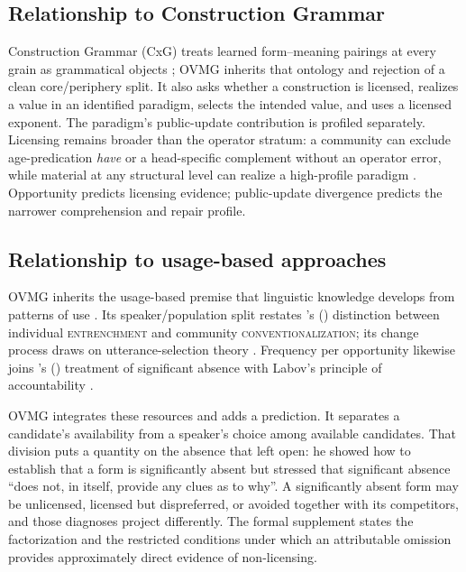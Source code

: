 \documentclass[12pt,letterpaper]{article}
\newcommand{\term}[1]{\textsc{#1}}
\newcommand{\mention}[1]{\textit{#1}}
\newcommand{\posscite}[1]{\citeauthor{#1}'s (\citeyear{#1})}
\begin{document}
\subsection{Relationship to Construction Grammar}

Construction Grammar (CxG) treats learned form--meaning pairings at every grain
as grammatical objects \autocite{fillmore1988mechanisms,fillmore1988,
kay1999grammatical,goldberg1995constructions,goldberg2019,sag2012sign}; OVMG
inherits that ontology and rejection of a clean core/periphery split. It also
asks whether a construction is licensed, realizes a value in an identified
paradigm, selects the intended value, and uses a licensed exponent. The
paradigm's public-update contribution is profiled separately. Licensing remains
broader than the operator stratum: a community can
exclude age-predication \mention{have} or a head-specific complement without an
operator error, while material at any structural level can realize a
high-profile paradigm \autocite{reynolds2026operators}. Opportunity predicts
licensing evidence; public-update divergence predicts the narrower
comprehension and repair profile.

\subsection{Relationship to usage-based approaches}\label{sec:usage-based}

OVMG inherits the usage-based premise that linguistic knowledge develops from
patterns of use \autocite{bybee2006,bybee2007frequency,bybee2010}. Its
speaker/population split restates \posscite{schmid2020} distinction between
individual \term{entrenchment} and community \term{conventionalization}; its
change process draws on utterance-selection theory
\autocite{croft2000,BlytheCroft2012}. Frequency per opportunity likewise joins
\posscite{Stefanowitsch_2006_NegativeEvidence} treatment of significant absence
with Labov's principle of accountability \autocite{labov1972}.

OVMG integrates these resources and adds a prediction. It separates a candidate's
availability from a speaker's choice among available candidates. That division
puts a quantity on the absence that
\citeauthor{Stefanowitsch_2006_NegativeEvidence} left open: he showed how to
establish that a form is significantly absent but stressed that significant
absence \enquote{does not, in itself, provide any clues as to why}. A
significantly absent form may be unlicensed, licensed but dispreferred, or
avoided together with its competitors, and those diagnoses project differently.
The formal supplement states the factorization and the restricted conditions
under which an attributable omission provides approximately direct evidence of
non-licensing.
\end{document}
